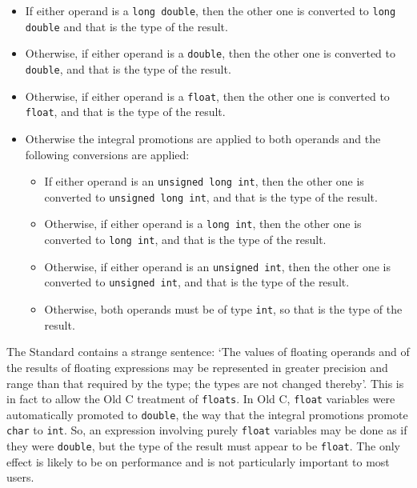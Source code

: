     \begin{itemize}
     \item If either operand is a \texttt{long double}, then the other one
      is converted to \texttt{long double} and that is the type of the
      result.

     \item Otherwise, if either operand is a \texttt{double}, then the other
      one is converted to \texttt{double}, and that is the type of the
      result.

     \item Otherwise, if either operand is a \texttt{float}, then the other
      one is converted to \texttt{float}, and that is the type of the
      result.

     \item Otherwise the integral promotions are applied to both operands and
      the following conversions are applied:

      \begin{itemize}
       \item If either operand is an \texttt{unsigned long int}, then the
        other one is converted to \texttt{unsigned long int}, and that is
        the type of the result.

       \item Otherwise, if either operand is a \texttt{long int}, then the
        other one is converted to \texttt{long int}, and that is the type
        of the result.

       \item Otherwise, if either operand is an \texttt{unsigned int}, then
        the other one is converted to \texttt{unsigned int}, and that is
        the type of the result.

       \item Otherwise, both operands must be of type \texttt{int}, so that
        is the type of the result.
      \end{itemize}
     
    \end{itemize}

    The Standard contains a strange sentence: `The values of floating
     operands and of the results of floating expressions may be represented in
     greater precision and range than that required by the type; the types are
     not changed thereby'. This is in fact to allow the Old C
     treatment of \texttt{floats}. In Old C, \texttt{float}
     variables were automatically promoted to \texttt{double}, the way
     that the integral promotions promote \texttt{char} to
     \texttt{int}. So, an expression involving purely \texttt{float}
     variables may be done as if they were \texttt{double}, but the type
     of the result must appear to be \texttt{float}. The only effect is
     likely to be on performance and is not particularly important to most
     users.


